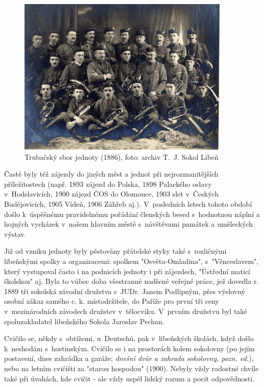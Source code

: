 \documentclass[a5paper, 12pt, twoside]{article}
\newcommand{\pozned}[1]{%
\textit{#1}}
\begin{document}
\begin{figure}[h!]
  \centering
  \includegraphics[width=0.9\textwidth]{img/trubaci.jpg}
  \caption*{Trubačský sbor jednoty (1886), foto: archiv T.~J. Sokol Libeň}
\end{figure}

Časté byly též zájezdy do jiných měst a jednot při nejrozmanitějších příležitostech (např. 1893 zájezd do Polska, 1898 Palackého oslavy v~Hodslavicích, 1900 zájezd ČOS do Olomouce, 1903 slet v~Českých Budějovicích, 1905 Vídeň, 1906 Záhřeb aj.). V~posledních letech tohoto období došlo k~úspěšnému pravidelnému pořádání členských besed s~hodnotnou náplní a hojných vycházek v~našem hlavním městě s~návštěvami památek a uměleckých výstav.

Již od vzniku jednoty byly pěstovány přátelské styky také s~rozličnými libeňskými spolky a organizacemi: spolkem "Osvěta-Omladina", s~"Věnceslavem", který vystupoval často i na podnicích jednoty i při zájezdech, "Ústřední maticí školskou" aj. Byla to vůbec doba všestranné nadšené veřejné práce, jež dovedla r. 1889 tři sokolská závodní družstva s~JUDr. Janem Podlipným, přes výslovný osobní zákaz samého c. k. místodržitele, do Paříže pro první tři ceny v~mezinárodních závodech družstev v~tělocviku. V~prvním družstvu byl také spoluzakladatel libeňského Sokola Jaroslav Pechan.

Cvičilo se, někdy s~obtížemi, u~Deutschů, pak v~libeňských školách, když došlo k~neshodám s~hostinským. Cvičilo se i na prostorách kolem sokolovny (po jejím postavení, dnes zahrádka a garáže; \pozned{dnešní dvůr a zahrada sokolovny, pozn. ed.}), nebo na letním cvičišti za "starou hospodou" (1900). Nebyly vždy radostné chvíle také při úvahách, kde cvičit - ale vždy uspěl lidský rozum a pocit odpovědnosti. 
\end{document}

